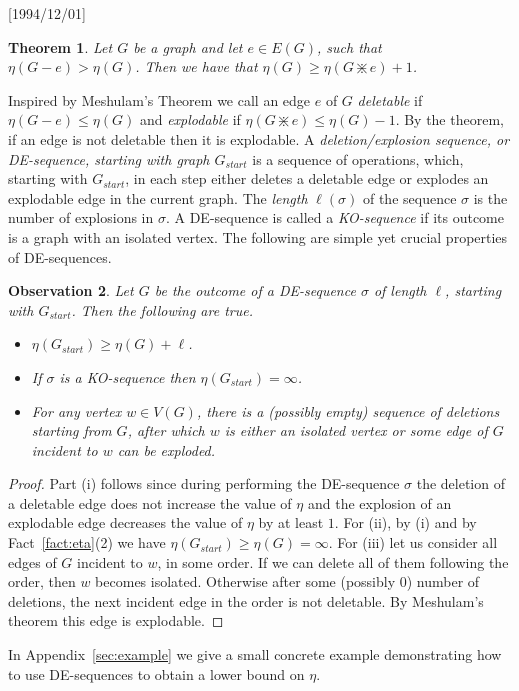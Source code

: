 \NeedsTeXFormat{LaTeX2e}[1994/12/01]\documentclass[letterpaper, 11pt]{article}
\newtheorem{thm}{Theorem}[section]
\newtheorem{obs}[thm]{Observation}
\theoremstyle{definition}
\theoremstyle{remark}
\numberwithin{equation}{section}
\newcommand{\explode}{\divideontimes}
\begin{document}
\begin{thm} \label{thm:meshulam}
Let $G$ be a graph and let $e \in E(G)$, such that $\eta(G-e) >
\eta(G)$. Then we have that $\eta(G) \geq \eta(G \explode e) + 1$.
\end{thm}

Inspired by Meshulam's Theorem we call an edge $e$ of $G$ {\em
  deletable} if $\eta(G-e) \leq \eta (G)$ and {\em explodable} if
$\eta(G\explode e) \leq \eta (G)-1$. By the theorem, if an edge is not
deletable then it is explodable.
A {\em deletion/explosion sequence, or DE-sequence,
  starting with graph $G_{start}$} is a sequence of
operations, which, starting with $G_{start}$, in each step either deletes a
deletable edge or explodes an explodable edge in the current graph.
The {\em length} $\ell (\sigma)$ of the sequence $\sigma$ is the
number of explosions in $\sigma$.  
A DE-sequence is called a {\em KO-sequence} if its outcome is a graph with an isolated vertex.
The  following are simple yet crucial properties of DE-sequences.   

\begin{obs}\label{obs:sequence}
  Let $G$ be the outcome of a DE-sequence $\sigma$ of length
  $\ell$, starting with $G_{start}$. Then the following are true.
  \begin{itemize}
 \item[(i)] $\eta (G_{start}) \geq \eta (G) + \ell$.
\item[(ii)] If $\sigma$ is a KO-sequence  then $\eta  (G_{start}) =\infty$. 
\item[(iii)] 
For any vertex $w\in V(G)$, there is a (possibly empty) sequence of deletions starting from $G$, after which $w$ is either an isolated vertex or  some edge of $G$ incident to $w$ can be exploded. 
  
  \end{itemize}
     \end{obs}
     \begin{proof}
Part (i) follows since during performing the DE-sequence $\sigma$
   the deletion of a deletable edge does not
increase the value of $\eta$ and the explosion of an explodable
edge decreases the value of $\eta$ by at least $1$. 
For (ii), by (i) and by Fact~\ref{fact:eta}(2) we have
$\eta (G_{start}) \geq \eta (G) = \infty $.
For (iii) let us consider all edges of $G$ incident to $w$, in some order.  If we can delete all of them following the order, then $w$ becomes isolated. Otherwise after some (possibly $0$) number of deletions, the next incident edge in the order is not deletable. By Meshulam's theorem this edge is explodable.  
\end{proof}
 In Appendix~\ref{sec:example} we give a small concrete example
demonstrating how to use DE-sequences to obtain a lower bound on $\eta$.
\end{document}
